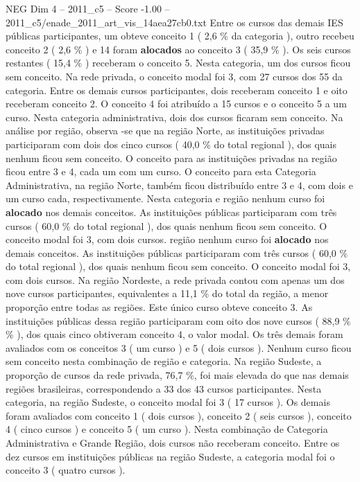 \begin{textsample}{NEG Dim 4 – 2011\_c5 – Score -1.00 – 2011\_c5/enade\_2011\_art\_vis\_14aea27cb0.txt}
Entre os cursos das demais IES públicas participantes, um obteve conceito 1 ( 2,6 \% da categoria ), outro recebeu conceito 2 ( 2,6 \% ) e 14 foram \textbf{alocados} ao conceito 3 ( 35,9 \% ).
Os seis cursos restantes ( 15,4 \% ) receberam o conceito 5.
Nesta categoria, um dos cursos ficou sem conceito.
Na rede privada, o conceito modal foi 3, com 27 cursos dos 55 da categoria.
Entre os demais cursos participantes, dois receberam conceito 1 e oito receberam conceito 2.
O conceito 4 foi atribuído a 15 cursos e o conceito 5 a um curso.
Nesta categoria administrativa, dois dos cursos ficaram sem conceito.
Na análise por região, observa -se que na região Norte, as instituições privadas participaram com dois dos cinco cursos ( 40,0 \% do total regional ), dos quais nenhum ficou sem conceito.
O conceito para as instituições privadas na região ficou entre 3 e 4, cada um com um curso.
O conceito para esta Categoria Administrativa, na região Norte, também ficou distribuído entre 3 e 4, com dois e um curso cada, respectivamente.
Nesta categoria e região nenhum curso foi \textbf{alocado} nos demais conceitos.
As instituições públicas participaram com três cursos ( 60,0 \% do total regional ), dos quais nenhum ficou sem conceito.
O conceito modal foi 3, com dois cursos. região nenhum curso foi \textbf{alocado} nos demais conceitos.
As instituições públicas participaram com três cursos ( 60,0 \% do total regional ), dos quais nenhum ficou sem conceito.
O conceito modal foi 3, com dois cursos.
Na região Nordeste, a rede privada contou com apenas um dos nove cursos participantes, equivalentes a 11,1 \% do total da região, a menor proporção entre todas as regiões.
Este único curso obteve conceito 3.
As instituições públicas dessa região participaram com oito dos nove cursos ( 88,9 \% \% ), dos quais cinco obtiveram conceito 4, o valor modal.
Os três demais foram avaliados com os conceitos 3 ( um curso ) e 5 ( dois cursos ).
Nenhum curso ficou sem conceito nesta combinação de região e categoria.
Na região Sudeste, a proporção de cursos da rede privada, 76,7 \%, foi mais elevada do que nas demais regiões brasileiras, correspondendo a 33 dos 43 cursos participantes.
Nesta categoria, na região Sudeste, o conceito modal foi 3 ( 17 cursos ).
Os demais foram avaliados com conceito 1 ( dois cursos ), conceito 2 ( seis cursos ), conceito 4 ( cinco cursos ) e conceito 5 ( um curso ).
Nesta combinação de Categoria Administrativa e Grande Região, dois cursos não receberam conceito.
Entre os dez cursos em instituições públicas na região Sudeste, a categoria modal foi o conceito 3 ( quatro cursos ).

\end{textsample}
